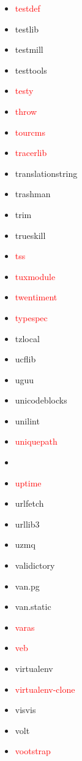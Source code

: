 \documentclass{l4proj}
\begin{document}
\begin{appendices}
{\begin{itemize}
\item\textcolor{red}{testdef}
\item testlib
\item testmill
\item testtools
\item\textcolor{red}{testy}
\item\textcolor{red}{throw}
\item\textcolor{red}{tourcms}
\end{itemize}
}%
\clearpage
\noindent\parbox[t]{0.32\textwidth}{\raggedright%
\begin{itemize}
\item\textcolor{red}{tracerlib}
\item translationstring
\item trashman
\item trim
\item trueskill
\item\textcolor{red}{tss}
\item\textcolor{red}{tuxmodule}
\item\textcolor{red}{twentiment}
\item\textcolor{red}{typespec}
\item tzlocal
\item ucflib
\item uguu
\item unicodeblocks
\item unilint
\item\textcolor{red}{uniquepath}
\item {}
\item\textcolor{red}{uptime}
\item urlfetch
\item urllib3
\item uzmq
\item validictory
\item van.pg
\item van.static
\item\textcolor{red}{varas}
\item\textcolor{red}{veb}
\item virtualenv
\item\textcolor{red}{virtualenv-clone}
\item visvis
\item volt
\end{itemize}
}%
\noindent\parbox[t]{0.32\textwidth}{\raggedright%
\begin{itemize}
\item\textcolor{red}{vootstrap}

\end{itemize}}
\end{appendices}
\end{document}
